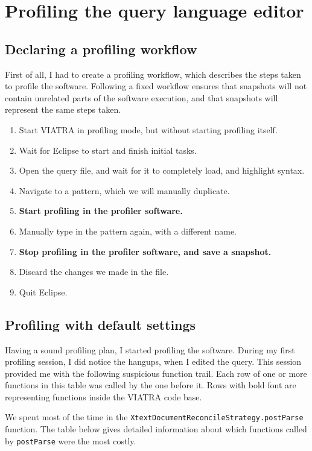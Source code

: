 \documentclass[11pt,a4paper,oneside]{report}
\begin{document}
\section{Profiling the query language editor}
\subsection{Declaring a profiling workflow}
First of all, I had to create a profiling workflow, which describes the steps
taken to profile the software. Following a fixed workflow ensures that snapshots
will not contain unrelated parts of the software execution, and that snapshots
will represent the same steps taken.

\begin{enumerate}
    \item{Start VIATRA in profiling mode, but without starting profiling itself.}
    \item{Wait for Eclipse to start and finish initial tasks.}
    \item{Open the query file, and wait for it to completely load, and highlight syntax.}
    \item{Navigate to a pattern, which we will manually duplicate.}
    \item{\textbf{Start profiling in the profiler software.}}
    \item{Manually type in the pattern again, with a different name.}
    \item{\textbf{Stop profiling in the profiler software, and save a snapshot.}}
    \item{Discard the changes we made in the file.}
    \item{Quit Eclipse.}
\end{enumerate}

\subsection{Profiling with default settings}
Having a sound profiling plan, I started profiling the software. During my
first profiling session, I did notice the hangups, when I edited the query. This
session provided me with the following suspicious function trail. Each row of
one or more functions in this table was called by the one before it. Rows with
bold font are representing functions inside the VIATRA code base.

We spent most of the time in the
\texttt{XtextDocumentReconcileStrategy.postParse} function. The table below
gives detailed information about which functions called by \texttt{postParse}
were the most costly.
\end{document}
